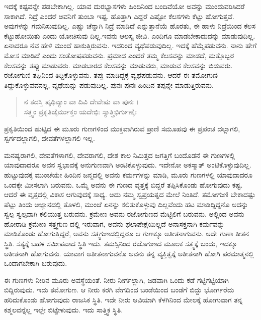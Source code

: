 ಇದಕ್ಕೆ ಕಷ್ಟವನ್ನೇ ಪಡಬೇಕಾಗಿಲ್ಲ. ಯಾವ ದುರಭ್ಯಾಸಗಳು ಹಿಂದಿನಿಂದ ಬಂದಿವೆಯೋ ಅವನ್ನು ಮುಂದುವರಿಸಿದರೆ ಸಾಕಾಗಿದೆ. ನಿದ್ರೆ ಎಂದರೆ ಅವನಿಗೆ ತುಂಬಾ ಇಷ್ಟ. ಹೊತ್ತಾಗಿ ಎದ್ದರೆ ಎಷ್ಟೋ ಕೆಲಸಗಳು ಕೆಟ್ಟು ಹೋಗುತ್ತವೆ. ಅವುಗಳನ್ನು ಗಮನಿಸುವುದಿಲ್ಲ. ಎಷ್ಚು ಚೆನ್ನಾಗಿ ನಿದ್ರೆ ಮಾಡಿದೆ ಎನ್ನುತ್ತಾನೆಯೆ ಹೊರತು, ಈ ಹಾಳು ನಿದ್ರೆಯಿಂದ ಕೆಲಸ ಕೆಟ್ಟುಹೋಯಿತು ಎಂದು ಯೋಚಿಸುವು ದಿಲ್ಲ.ಇವನು ಆಲಸ್ಯ ಜೀವಿ. ಎಂದಿಗೂ ಮಾಡಬೇಕಾದುದನ್ನು ಮಾಡುವುದಿಲ್ಲ. ಏನಾದರೂ ನೆವ ಹೇಳಿ ಮುಂದೆ ಹಾಕುತ್ತಿರುವನು. ಇದರಿಂದ ವ್ಯಥೆಪಡುವುದಿಲ್ಲ. ಇದಕ್ಕೆ ಹೆಮ್ಮೆಪಡುವನು. ನಾನು ಹೇಗೆ ಮೋಸ ಮಾಡಿದೆ ಎಂದು ಸಂತೋಷಪಡುವನು. ಪ್ರಮಾದ ಎಂದರೆ ತಮ್ಮ ಕೆಲಸವನ್ನು ಮಾಡದೆ, ಮತ್ತೊಬ್ಬರ ಕೆಲಸವನ್ನು ತಪ್ಪು ಮಾಡುವರು. ಮಾಡಬಾರದ ಕೆಲಸವನ್ನು ಮಾಡುವರು, ಮಾಡುವ ಕೆಲಸವನ್ನು ಬಿಡುವರು. ರಜೋಗುಣಿ ತಪ್ಪಿನಿಂದ ತಿದ್ದಿಕೊಳ್ಳುವನು. ತಪ್ಪು ಮಾಡಿದ್ದಕ್ಕೆ ವ್ಯಥೆಪಡುವನು. ಆದರೆ ಈ ತಮೋಗುಣಿ ತಿದ್ದುಕೊಳ್ಳುವವನಲ್ಲ, ವ್ಯಥೆಯನ್ನು ಪಡುವುದಿಲ್ಲ. ಪುನಃ ಪುನಃ ಹಿಂದಿನ ತಪ್ಪನ್ನೇ ಮಾಡುತ್ತಿರುವನು.

\begin{verse}
ನ ತದಸ್ತಿ ಪೃಥಿವ್ಯಾಂ ವಾ ದಿವಿ ದೇವೇಷು ವಾ ಪುನಃ ।\\ಸತ್ತ್ವಂ ಪ್ರಕೃತಿಜೈರ್ಮುಕ್ತಂ ಯದೇಭಿಃ ಸ್ಯಾತ್ತ್ರಿಭಿರ್ಗುಣೈಃ 
\end{verse}

{\small ಪ್ರಕೃತಿಯಿಂದ ಹುಟ್ಟಿದ ಈ ಮೂರು ಗುಣಗಳಿಂದ ಮುಕ್ತವಾಗಿರುವ ಪ್ರಾಣಿ ಸಮೂಹವು ಈ ಪ್ರಪಂಚ ದಲ್ಲಾಗಲಿ, ಸ್ವರ್ಗದಲ್ಲಾಗಲಿ, ದೇವತೆಗಳಲ್ಲಾಗಲಿ ಇಲ್ಲ.}

ಮನಷ್ಯರಾಗಲಿ, ದೇವತೆಗಳಾಗಲಿ, ದೇವರಾಗಲಿ, ದೇಶ ಕಾಲ ನಿಮಿತ್ತದ ಜಗತ್ತಿಗೆ ಬಂದೊಡನೆ ಈ ಗುಣಗಳಲ್ಲಿ ಯಾವುದಾದರೂ ಅವನ ಸ್ವಭಾವಕ್ಕೆ ಅನುಗುಣವಾಗಿ ಅಂಟಿಕೊಳ್ಳುವುದು. ಇದೇನೋ ಅಕಸ್ಮಾತ್ ಅಂಟಿಕೊಳ್ಳುವುದಿಲ್ಲ. ಹುಟ್ಟುವುದಕ್ಕೆ ಮುಂಚೆಯೇ ಹಿಂದಿನ ಜನ್ಮದಲ್ಲಿ ಅವನು ಕರ್ಮಗಳನ್ನು ಮಾಡಿ, ಮೂರು ಗುಣಗಳಲ್ಲಿ ಯಾವುದಾದರೂ ಒಂದಕ್ಕೇ ಮೀಸಲಾಗಿ ಬರುವನು. ಒಮ್ಮೆ ಅವನು ಈ ಗುಣದ ವೃತ್ತಕ್ಕೆ ಬಿದ್ದರೆ ತಪ್ಪಿಸಿಕೊಂಡು ಹೋಗುವುದು ಕಷ್ಟ. ಆದರೆ ಈ ವೃತ್ತದಲ್ಲಿ ವಿಕಾಸ ಆಗುವುದಕ್ಕೆ ಸಾಧ್ಯ. ಅದು ನಮ್ಮ ಸ್ವಪ್ರಯತ್ನದ ಮೇಲೆ ನಿಂತಿದೆ. ತಮೋಗುಣಿ ಬೇಕಾದಷ್ಟು ಪೆಟ್ಟು ತಿಂದು ಅಜ್ಞಾನದಲ್ಲಿ ತೊಳಲಿ, ಮುಂಚೆ ಏನನ್ನು ಕಲಿತುಕೊಳ್ಳುವು ದಿಲ್ಲವೆಂದು ಹಟ ಮಾಡಿದ್ದಿದ್ದನೊ ಅದನ್ನು ಸ್ವಲ್ಪ ಸ್ವಲ್ಪವಾಗಿ ಕಲಿಯುತ್ತ ಬರುವನು. ಕ್ರಮೇಣ ಅವನು ರಜೋಗುಣದ ಮೆಟ್ಟಿಲಿಗೆ ಬರುವನು. ಅಲ್ಲಿಂದ ಅವನು ಹೋರಾಡಿ ಕ್ರಮೇಣ ಸತ್ತ್ವಗುಣ ದಲ್ಲಿ ಇರುವಾಗ, ಅವನು ಫಲಾಪೇಕ್ಷೆಯಿಲ್ಲದೆ ಅನಾಸಕ್ತನಾಗಿ ಕರ್ಮವನ್ನು ಮಾಡಿಕೊಂಡು ಹೋಗುತ್ತಿದ್ದರೆ, ಅವನು ಸತ್ತ್ವಗುಣದಲ್ಲಿದ್ದರೂ ಆ ಗುಣಕ್ಕೂ ಅತೀತನಾಗುವನು. ಅದೇ ಗುಣಾ ತೀತನ ಸ್ಥಿತಿ. ಸತ್ಯಕ್ಕೆ ಬಹಳ ಸಮೀಪವಾದ ಸ್ಥಿತಿ ಇದು. ತಮಸ್ಸಿನಿಂದ ರಜೊಗುಣದ ಮೂಲಕ ಸತ್ತ್ವಕ್ಕೆ ಬಂದು, ಇದಕ್ಕೂ ಅತೀತನಾಗಿ ಹೋಗುವನು. ಯಾವಾಗ ಅತೀತನಾಗುವನೊ ಅವನು ತನ್ನ ವ್ಯಕ್ತಿತ್ವಕ್ಕೆ ಅತೀತನಾಗಿ ಹೋಗಿ ಪರಮಾತ್ಮನಲ್ಲಿ ಒಂದಾಗಬೇಕಾಗಿ ಬರುವುದು.

ಈ ಗುಣಗಳು ನೀರಿನ ಮೂರು ಅವಸ್ಥೆಯಂತೆ. ನೀರು ನೀರ್ಗಲ್ಲಾಗಿ, ಜಡವಾಗಿ ಒಂದು ಕಡೆ ಗಟ್ಟಿಗಟ್ಟಿಯಾಗಿ ಬಿದ್ದಿರುವುದು. ಇದು ತಮೋಗುಣ. ಆ ನೀರು ಕರಗಿ ವೇಗದಿಂದ ಬಂಡೆಯಿಂದ ಬಂಡೆಗೆ ಬಿದ್ದು ಭೋರ್ಗರೆದು ಹರಿದುಕೊಂಡು ಹೋಗುವುದು ರಾಜಸಿಕ ಸ್ಥಿತಿ. ಇದೇ ನೀರು ಆವಿಯಾಗಿ ಕೆಳಗಿನಿಂದ ಮೇಲಕ್ಕೆ ಹೋಗುವಾಗ ತನ್ನ ಕಶ್ಮಲವನ್ನೆಲ್ಲ ಇಲ್ಲೇ ಬಿಟ್ಟೇಳುವುದು. ಇದು ಸಾತ್ತ್ವಿಕ ಸ್ಥಿತಿ.

